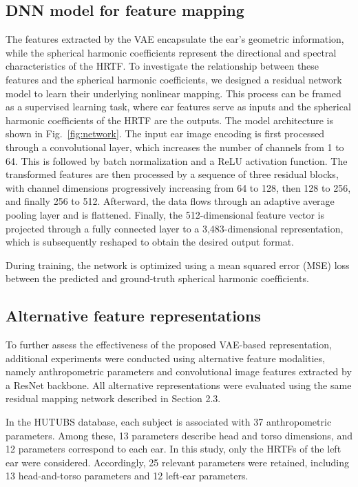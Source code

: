 \documentclass[a4paper,fleqn]{cas-dc}
\begin{document}
\subsection{DNN model for feature mapping}
The features extracted by the VAE encapsulate the ear’s geometric information, while the spherical harmonic coefficients represent the directional and spectral characteristics of the HRTF. To investigate the relationship between these features and the spherical harmonic coefficients, we designed a residual network model to learn their underlying nonlinear mapping. This process can be framed as a supervised learning task, where ear features serve as inputs and the spherical harmonic coefficients of the HRTF are the outputs. The model architecture is shown in Fig.~\ref{fig:network}. The input ear image encoding is first processed through a convolutional layer, which increases the number of channels from 1 to 64. This is followed by batch normalization and a ReLU activation function. The transformed features are then processed by a sequence of three residual blocks, with channel dimensions progressively increasing from 64 to 128, then 128 to 256, and finally 256 to 512. Afterward, the data flows through an adaptive average pooling layer and is flattened. Finally, the 512-dimensional feature vector is projected through a fully connected layer to a 3,483-dimensional representation, which is subsequently reshaped to obtain the desired output format.

During training, the network is optimized using a mean squared error (MSE) loss between the predicted and ground-truth spherical harmonic coefficients.

\subsection{Alternative feature representations}

To further assess the effectiveness of the proposed VAE-based representation, additional experiments were conducted using alternative feature modalities, namely anthropometric parameters and convolutional image features extracted by a ResNet backbone. All alternative representations were evaluated using the same residual mapping network described in Section 2.3.

In the HUTUBS database, each subject is associated with 37 anthropometric parameters. Among these, 13 parameters describe head and torso dimensions, and 12 parameters correspond to each ear. In this study, only the HRTFs of the left ear were considered. Accordingly, 25 relevant parameters were retained, including 13 head-and-torso parameters and 12 left-ear parameters.
\end{document}
